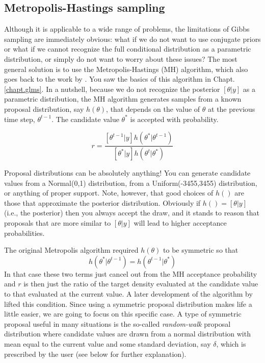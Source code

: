 \subsection{ Metropolis-Hastings sampling   }
\label{mcmc.sec.mh}

Although it is applicable to a wide range of problems, the limitations
of Gibbs sampling are immediately obvious: what if we do not want to
use conjugate priors or what if we cannot recognize the full
conditional distribution as a parametric distribution, or simply do
not want to worry about these issues? The most general solution is to
use the Metropolis-Hastings (MH) algorithm, which also goes back to
the work by \citet{metropolis_ulam:1953}. You saw the basics of this
algorithm in Chapt. \ref{chapt.glms}. In a nutshell, because we do not recognize the
posterior $[\theta|y]$ as a parametric distribution, the MH algorithm
generates samples from a known proposal distribution, say $h(\theta)$,
that depends on the value of $\theta$ at the previous time step,  $\theta^{t-1}$. The candidate value $\theta^*$ is accepted with probability.

\[
r = \frac{ [\theta^{t-1}|y] h(\theta^{*}|\theta^{t-1})}
    {[\theta^{*}|y] h(\theta^{t}|\theta^{*}) }
\]

Proposal distributions can be absolutely
anything!  You can generate candidate values from a Normal(0,1)
distribution, from a Uniform(-3455,3455) distribution, or anything of
proper support.  Note, however, that good choices of $h()$ are those
that approximate the posterior distribution. Obviously if $h() =
[\theta|y]$ (i.e., the posterior) then you always accept the draw,
and it stands to reason that proposals that are more similar to
$[\theta|y]$ will lead to higher acceptance probabilities.

The original Metropolis algorithm
required $h(\theta)$ to be symmetric so that
\[
h(\theta^{*}|\theta^{t-1}) = h(\theta^{t-1}|\theta^{*})
\]
In that case these two terms just cancel
out from the MH acceptance probability and $r$ is then just the ratio
of the target density evaluated at the candidate value to that
evaluated at the current value. A later
development of the algorithm by \citet{hastings:1970} lifted this
condition.
Since using a symmetric proposal distribution makes life a little
easier, we are going to focus on this specific case. A type of symmetric proposal useful in many situations is the
so-called {\it random-walk} proposal distribution where candidate values
are drawn from a normal distribution with mean equal to the current
value and some standard deviation, say $\delta$, which is prescribed by
the user (see below for further explanation).

